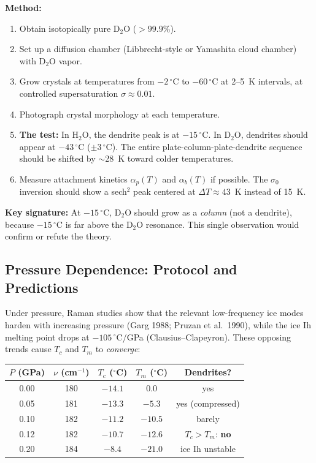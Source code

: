 \documentclass[12pt,letterpaper]{article}
\begin{document}
\textbf{Method:}
\begin{enumerate}[nosep]
\item Obtain isotopically pure D$_2$O ($> 99.9\%$).
\item Set up a diffusion chamber (Libbrecht-style or Yamashita cloud chamber) with D$_2$O vapor.
\item Grow crystals at temperatures from $-2\,{}^\circ$C to $-60\,{}^\circ$C at 2--5~K intervals, at controlled supersaturation $\sigma \approx 0.01$.
\item Photograph crystal morphology at each temperature.
\item \textbf{The test:}  In H$_2$O, the dendrite peak is at $-15\,{}^\circ$C.  In D$_2$O, dendrites should appear at $-43\,{}^\circ$C ($\pm 3\,{}^\circ$C).  The entire plate-column-plate-dendrite sequence should be shifted by $\sim$28~K toward colder temperatures.
\item Measure attachment kinetics $\alpha_p(T)$ and $\alpha_b(T)$ if possible.  The $\sigma_0$ inversion should show a sech$^2$ peak centered at $\Delta T \approx 43$~K instead of 15~K.
\end{enumerate}
\textbf{Key signature:} At $-15\,{}^\circ$C, D$_2$O should grow as a \emph{column} (not a dendrite), because $-15\,{}^\circ$C is far above the D$_2$O resonance.  This single observation would confirm or refute the theory.

\subsection{Pressure Dependence: Protocol and Predictions}

Under pressure, Raman studies show that the relevant low-frequency ice modes harden with increasing pressure (Garg 1988; Pruzan et al.\ 1990), while the ice Ih melting point drops at $-105\,{}^\circ$C/GPa (Clausius--Clapeyron).  These opposing trends cause $T_c$ and $T_m$ to \emph{converge}:

\begin{center}
\begin{tabular}{@{}ccccc@{}}
\toprule
$P$ (GPa) & $\nu$ (cm$^{-1}$) & $T_c$ (${}^\circ$C) & $T_m$ (${}^\circ$C) & Dendrites? \\
\midrule
0.00 & 180 & $-14.1$ & $0.0$ & yes \\
0.05 & 181 & $-13.3$ & $-5.3$ & yes (compressed) \\
0.10 & 182 & $-11.2$ & $-10.5$ & barely \\
0.12 & 182 & $-10.7$ & $-12.6$ & $T_c > T_m$: \textbf{no} \\
0.20 & 184 & $-8.4$ & $-21.0$ & ice Ih unstable \\
\bottomrule
\end{tabular}
\end{center}
\end{document}

